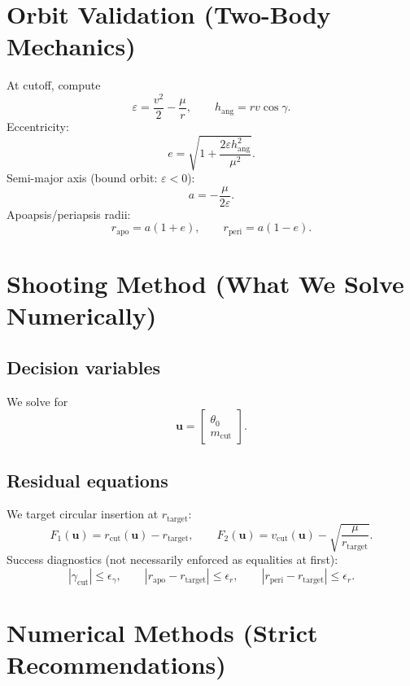 \documentclass[11pt]{article}
\begin{document}
\section{Orbit Validation (Two-Body Mechanics)}
At cutoff, compute
\begin{equation}
\varepsilon=\frac{v^2}{2}-\frac{\mu}{r},\qquad
h_{\text{ang}}=rv\cos\gamma.
\end{equation}
Eccentricity:
\begin{equation}
e=\sqrt{1+\frac{2\varepsilon h_{\text{ang}}^2}{\mu^2}}.
\end{equation}
Semi-major axis (bound orbit: $\varepsilon<0$):
\begin{equation}
a=-\frac{\mu}{2\varepsilon}.
\end{equation}
Apoapsis/periapsis radii:
\begin{equation}
r_{\text{apo}}=a(1+e),\qquad r_{\text{peri}}=a(1-e).
\end{equation}

\section{Shooting Method (What We Solve Numerically)}
\subsection{Decision variables}
We solve for
\[
\bm{u}=\begin{bmatrix}\theta_0\\ m_{\text{cut}}\end{bmatrix}.
\]

\subsection{Residual equations}
We target circular insertion at $r_{\text{target}}$:
\begin{equation}
F_1(\bm{u})=r_{\text{cut}}(\bm{u})-r_{\text{target}},
\qquad
F_2(\bm{u})=v_{\text{cut}}(\bm{u})-\sqrt{\frac{\mu}{r_{\text{target}}}}.
\end{equation}
Success diagnostics (not necessarily enforced as equalities at first):
\[
|\gamma_{\text{cut}}|\le \epsilon_\gamma,\qquad |r_{\text{apo}}-r_{\text{target}}|\le \epsilon_r,\qquad |r_{\text{peri}}-r_{\text{target}}|\le \epsilon_r.
\]

\section{Numerical Methods (Strict Recommendations)}
\end{document}
